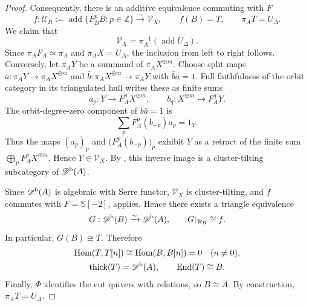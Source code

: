 \documentclass[12pt,a4paper,english,reqno]{amsart}
\theoremstyle{plain}
\theoremstyle{definition}
\numberwithin{equation}{section}
\def\De{\Delta}
\def\Ph{\Phi}
\def\Hom{\operatorname{Hom}}
\def\End{\operatorname{End}}
\def\thick{\operatorname{thick}}
\def\add{\operatorname{add}}
\def\Db{{\mathcal D}^{\text{\rm b}}}
\def\bbZ{{\mathbb Z}}
\def\iso{\cong}
\def\ds{\oplus}
\def\Ds{\bigoplus}
\def\ya#1{\xrightarrow{#1}}
\begin{document}
\begin{proof}
Consequently, there is an additive equivalence commuting with $F$
\[
 f:\mathcal U_B:=\add\{F_B^pB:p\in\bbZ\}\ya{\sim}\mathcal V_X,
 \qquad f(B)=T,\qquad \pi_A T=U_\De.
\]
We claim that
\[
 \mathcal V_X=\pi_A^{-1}(\add U_\De).
\]
Since $\pi_A F_A\simeq\pi_A$ and $\pi_A X=U_\De$, the inclusion from left to right follows. Conversely, let $\pi_A Y$ be a summand of $\pi_A X^{\ds m}$. Choose split maps $\bar a:\pi_A Y\to\pi_A X^{\ds m}$ and $\bar b:\pi_A X^{\ds m}\to\pi_A Y$ with $\bar b\bar a=1$. Full faithfulness of the orbit category in its triangulated hull writes these as finite sums
\[
 a_p:Y\longrightarrow F_A^pX^{\ds m},\qquad
 b_q:X^{\ds m}\longrightarrow F_A^qY.
\]
The orbit-degree-zero component of $\bar b\bar a=1$ is
\[
 \sum_p F_A^p(b_{-p})a_p=1_Y.
\]
Thus the maps $(a_p)_p$ and $\bigl(F_A^p(b_{-p})\bigr)_p$ exhibit $Y$ as a retract of the finite sum $\Ds_pF_A^pX^{\ds m}$. Hence $Y\in\mathcal V_X$. By \cite[Proposition 3.1]{AO}, this inverse image is a cluster-tilting subcategory of $\Db(A)$.

Since $\Db(A)$ is algebraic with Serre functor, $\mathcal V_X$ is cluster-tilting, and $f$ commutes with $F=\mathbb S[-2]$, \cite[Theorem 3.5]{AO} applies. Hence there exists a triangle equivalence
\[
 G:\Db(B)\ya{\sim}\Db(A),\qquad G|_{\mathcal U_B}\iso f.
\]
In particular, $G(B)\iso T$. Therefore
\[
\begin{gathered}
 \Hom(T,T[n])\iso\Hom(B,B[n])=0\quad(n\ne0),\\
 \thick(T)=\Db(A),\qquad \End(T)\iso B.
\end{gathered}
\]
Finally, $\Ph$ identifies the cut quivers with relations, so $B\iso A$. By construction, $\pi_A T=U_\De$.
\end{proof}
\end{document}
